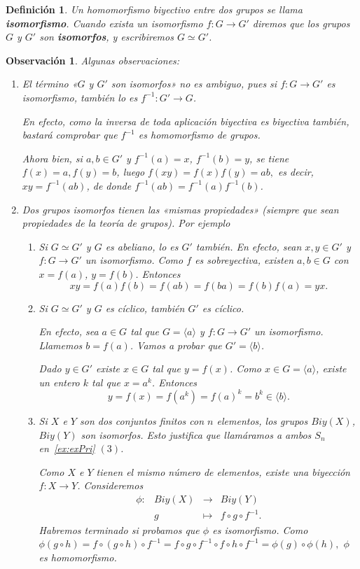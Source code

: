 \documentclass[12pt]{article}
\newtheorem{definition}[theorem]{Definición}
\newtheorem{observation}{Observación}[theorem]
\begin{document}
\begin{definition}Un homomorfismo biyectivo entre dos grupos se llama \textbf{isomorfismo}. Cuando exista un isomorfismo $f \colon G \longrightarrow G'$ diremos que los grupos $G$ y $G'$ son \textbf{isomorfos}, y escribiremos $G \simeq G'$.
\end{definition}

\begin{observation}\label{ob:obsIso} Algunas observaciones:
\begin{enumerate}
\item El término «$G$ y $G'$ son isomorfos» no es ambiguo, pues si $f \colon G \longrightarrow G'$ es isomorfismo, también lo es $f^{-1}\colon G' \longrightarrow G$. 

En efecto, como la inversa de toda aplicación biyectiva es biyectiva también, bastará comprobar que $f^{-1}$ es homomorfismo de grupos.

Ahora bien, si $a,b \in G'$ y $f^{-1}(a) = x$, $f^{-1}(b) = y$, se tiene $f(x) = a, f(y) = b$, luego $f(xy) = f(x) f(y) = ab,$ es decir, $xy = f^{-1}(ab)$, de donde $f^{-1}(ab) = f^{-1}(a)f^{-1}(b)$.
\item Dos grupos isomorfos tienen las «mismas propiedades» (siempre que sean propiedades de la teoría de grupos). Por ejemplo 
\begin{enumerate}
\item Si $G \simeq G'$ y $G$ es abeliano, lo es $G'$ también. En efecto, sean $x,y \in G'$ y $f \colon G \longrightarrow G'$ un isomorfismo. Como $f$ es sobreyectiva, existen $a,b \in G$ con $x = f(a)$, $y = f(b)$. Entonces $$xy = f(a)f(b) = f(ab) = f(ba) = f(b)f(a) = yx.$$
\item Si $G \simeq G'$ y $G$ es cíclico, también $G'$ es cíclico. 

En efecto, sea $a \in G$ tal que $G = \langle a \rangle$ y $f \colon G\longrightarrow G'$ un isomorfismo. Llamemos $b= f(a)$. Vamos a probar que $G' = \langle b \rangle$. 

Dado $y \in G'$ existe $x \in G$ tal que $y = f(x)$. Como $x \in G = \langle a \rangle$, existe un entero $k$ tal que $x = a^k$. Entonces $$y=f(x) = f(a^k) = f(a)^k = b^k \in \langle b \rangle.$$
\item Si $X$ e $Y$ son dos conjuntos finitos con $n$ elementos, los grupos $Biy(X)$, $Biy(Y)$ son isomorfos. Esto justifica que llamáramos a ambos $S_n$ en~\ref{ex:exPri} $(3)$.

Como $X$ e $Y$ tienen el mismo número de elementos, existe una biyección $f \colon X \longrightarrow Y$. Consideremos  $$\begin{array}{rccl}
\phi\colon &Biy(X)& \longrightarrow &Biy(Y)\\
&g& \longmapsto &f \circ g \circ f^{-1}.
\end{array}
$$ Habremos terminado si probamos que $\phi$ es isomorfismo. Como $\phi(g \circ h) = f \circ (g \circ h) \circ f^{-1} = f \circ g \circ f^{-1} \circ f \circ h \circ f^{-1} = \phi(g) \circ \phi(h),$ $\phi$ es homomorfismo. 


\end{enumerate}
\end{enumerate}
\end{observation}
\end{document}

